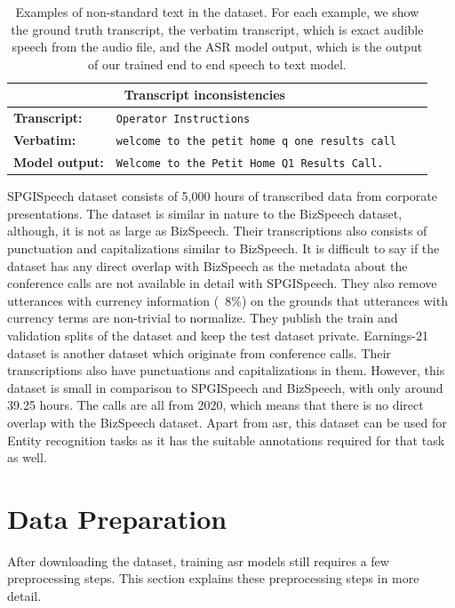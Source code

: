 \begin{table}[ht]
\begin{tabular}{ l p{9.6cm} c c }
 \multicolumn{2}{c}{\textbf{Transcript inconsistencies}} \\
 \hline
 \textbf{Transcript:} & \verb|Operator Instructions| \\ 
 \textbf{Verbatim:} & \verb|welcome to the petit home q one results call| \\
 \textbf{Model output:} & \verb|Welcome to the Petit Home Q1 Results Call.|\\
 \hline\hline
\end{tabular}
\caption{\label{table:examples}Examples of non-standard text in the dataset. For each example, we show the ground truth transcript, the verbatim transcript, which is exact audible speech from the audio file, and the ASR model output, which is the output of our trained end to end speech to text model.}
\end{table}


SPGISpeech\cite{Oneill2021SPGISpeech:Recognition} dataset consists of 5,000 hours of transcribed data from corporate presentations. The dataset is similar in nature to the BizSpeech dataset, although, it is not as large as BizSpeech. Their transcriptions also consists of punctuation and capitalizations similar to BizSpeech. It is difficult to say if the dataset has any direct overlap with BizSpeech as the metadata about the conference calls are not available in detail with SPGISpeech. They also remove utterances with currency information (~8\%) on the grounds that utterances with currency terms are non-trivial to normalize. They publish the train and validation splits of the dataset and keep the test dataset private. Earnings-21 dataset \cite{DelRio2021Earnings-21:Wild} is another dataset which originate from conference calls. Their transcriptions also have punctuations and capitalizations in them. However, this dataset is small in comparison to SPGISpeech and BizSpeech, with only around 39.25 hours. The calls are all from 2020, which means that there is no direct overlap with the BizSpeech dataset. Apart from \acrshort{asr}, this dataset can be used for Entity recognition tasks as it has the suitable annotations required for that task as well.

\section{Data Preparation}
\label{section:dataprep}
After downloading the dataset, training \acrshort{asr} models still requires a few preprocessing steps. This section explains these preprocessing steps in more detail. 

